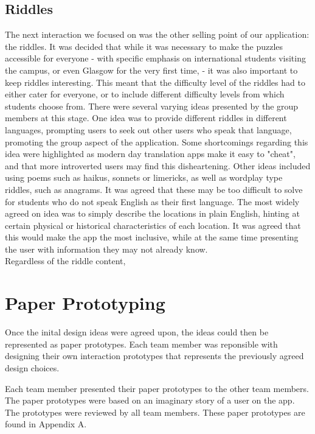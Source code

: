\documentclass[10pt,twocolumn]{article} %
\begin{document}
\subsection*{Riddles}
The next interaction we focused on was the other selling point of our application: the riddles. 
It was decided that while it was necessary to make the puzzles accessible for everyone - with specific emphasis on international students visiting the campus, or even Glasgow for the very first time, - it was also important to keep riddles interesting.
This meant that the difficulty level of the riddles had to either cater for everyone, or to include different difficulty levels from which students choose from.
There were several varying ideas presented by the group members at this stage.
One idea was to provide different riddles in different languages, prompting users to seek out other users who speak that language, promoting the group aspect of the application. Some shortcomings regarding this idea were highlighted as modern day translation apps make it easy to "cheat", and that more introverted users may find this disheartening.
Other ideas included using poems such as haikus, sonnets or limericks, as well as wordplay type riddles, such as anagrams. It was agreed that these may be too difficult to solve for students who do not speak English as their first language.
The most widely agreed on idea was to simply describe the locations in plain English, hinting at certain physical or historical characteristics of each location. It was agreed that this would make the app the most inclusive, while at the same time presenting the user with information they may not already know.\\
Regardless of the riddle content, 



\section*{Paper Prototyping}
Once the inital design ideas were agreed upon, the ideas could then be represented as paper prototypes. Each team member was reponsible with designing their own interaction prototypes that represents the previously agreed design choices.

Each team member presented their paper prototypes to the other team members. The paper prototypes were based on an imaginary story of a user on the app. The prototypes were reviewed by all team members. These paper prototypes are found in Appendix A.
\end{document}
